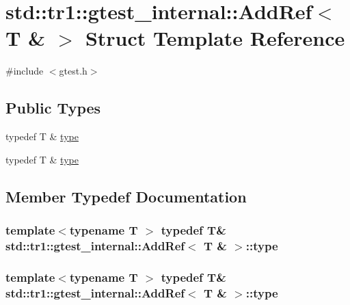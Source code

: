 \hypertarget{structstd_1_1tr1_1_1gtest__internal_1_1_add_ref_3_01_t_01_6_01_4}{\section{std\-:\-:tr1\-:\-:gtest\-\_\-internal\-:\-:Add\-Ref$<$ T \& $>$ Struct Template Reference}
\label{structstd_1_1tr1_1_1gtest__internal_1_1_add_ref_3_01_t_01_6_01_4}
}


{\ttfamily \#include $<$gtest.\-h$>$}

\subsection*{Public Types}
\begin{DoxyCompactItemize}
\item 
typedef T \& \hyperlink{structstd_1_1tr1_1_1gtest__internal_1_1_add_ref_3_01_t_01_6_01_4_a9cb3b0992c2a9e7df42d01fb64c2dc88}{type}
\item 
typedef T \& \hyperlink{structstd_1_1tr1_1_1gtest__internal_1_1_add_ref_3_01_t_01_6_01_4_a9cb3b0992c2a9e7df42d01fb64c2dc88}{type}
\end{DoxyCompactItemize}


\subsection{Member Typedef Documentation}
\hypertarget{structstd_1_1tr1_1_1gtest__internal_1_1_add_ref_3_01_t_01_6_01_4_a9cb3b0992c2a9e7df42d01fb64c2dc88}{
\subsubsection[{type}]{\setlength{\rightskip}{0pt plus 5cm}template$<$typename T $>$ typedef T\& {\bf std\-::tr1\-::gtest\-\_\-internal\-::\-Add\-Ref}$<$ T \& $>$\-::{\bf type}}}\label{structstd_1_1tr1_1_1gtest__internal_1_1_add_ref_3_01_t_01_6_01_4_a9cb3b0992c2a9e7df42d01fb64c2dc88}
\hypertarget{structstd_1_1tr1_1_1gtest__internal_1_1_add_ref_3_01_t_01_6_01_4_a9cb3b0992c2a9e7df42d01fb64c2dc88}{
\subsubsection[{type}]{\setlength{\rightskip}{0pt plus 5cm}template$<$typename T $>$ typedef T\& {\bf std\-::tr1\-::gtest\-\_\-internal\-::\-Add\-Ref}$<$ T \& $>$\-::{\bf type}}}\label{structstd_1_1tr1_1_1gtest__internal_1_1_add_ref_3_01_t_01_6_01_4_a9cb3b0992c2a9e7df42d01fb64c2dc88}


